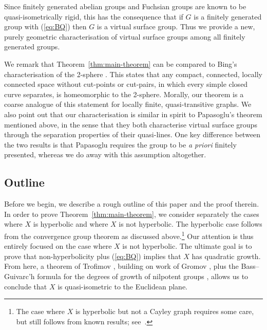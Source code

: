 \documentclass[11pt,a4paper]{amsart}
\theoremstyle{definition}
\newcommand{\property}{(\ref{eq:BQ})}
\begin{document}
Since finitely generated abelian groups and Fuchsian groups are known to be quasi-isometrically rigid, this has the consequence that if $G$ is a finitely generated group with \property{} then $G$ is a virtual surface group. Thus we provide a new, purely geometric characterisation of virtual surface groups among all finitely generated groups.

We remark that Theorem~\ref{thm:main-theorem} can be compared to Bing's characterisation of the 2-sphere \cite{bing1946kline}. This states that any compact, connected, locally connected space without cut-points or cut-pairs, in which every simple closed curve separates, is homeomorphic to the 2-sphere. Morally, our theorem is a coarse analogue of this statement for locally finite, quasi-transitive graphs.
We also point out that our characterisation is similar in spirit to Papasoglu's theorem mentioned above, in the sense that they both characterise virtual surface groups through the separation properties of their quasi-lines. One key difference between the two results is that Papasoglu requires the group to be \emph{a priori} finitely presented, whereas we do away with this assumption altogether.

\subsection*{Outline}

Before we begin, we describe a rough outline of this paper and the proof therein.
In order to prove Theorem~\ref{thm:main-theorem}, we consider separately the cases where $X$ is hyperbolic and where $X$ is not hyperbolic. The hyperbolic case follows from the convergence group theorem as discussed above.\footnote{The case where $X$ is hyperbolic but not a Cayley graph requires some care, but still follows from known results; see~\cite[\S1.1]{macmanus2024note}.} Our attention is thus entirely focused on the case where $X$ is not hyperbolic.
The ultimate goal is to prove that non-hyperbolicity plus \property{} implies that $X$ has quadratic growth. From here, a theorem of Trofimov  \cite{trofimov1985graphs}, building on work of Gromov \cite{gromov1981groups}, plus the Bass--Guivarc'h formula for the degrees of growth of nilpotent groups \cite{bass1972degree, guivarc1973croissance}, allows us to conclude that $X$ is quasi-isometric to the Euclidean plane.
\end{document}
